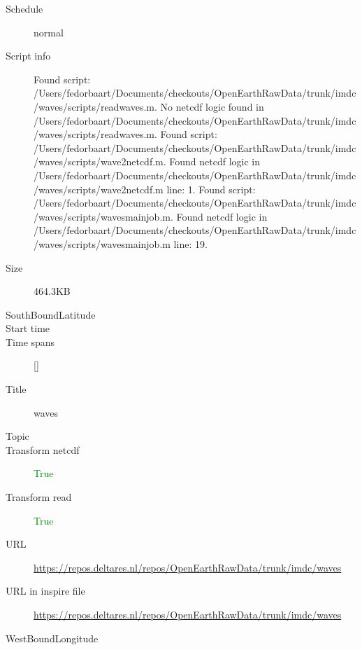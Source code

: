 \documentclass[9]{report}
\begin{document}
\begin{description}
\begin{verbatim}
\end{verbatim}
  \item[Schedule] normal
  \item[Script info] Found script: /Users/fedorbaart/Documents/checkouts/OpenEarthRawData/trunk/imdc/waves/scripts/readwaves.m.
No netcdf logic found in /Users/fedorbaart/Documents/checkouts/OpenEarthRawData/trunk/imdc/waves/scripts/readwaves.m.
Found script: /Users/fedorbaart/Documents/checkouts/OpenEarthRawData/trunk/imdc/waves/scripts/wave2netcdf.m.
Found netcdf logic in /Users/fedorbaart/Documents/checkouts/OpenEarthRawData/trunk/imdc/waves/scripts/wave2netcdf.m line: 1.
Found script: /Users/fedorbaart/Documents/checkouts/OpenEarthRawData/trunk/imdc/waves/scripts/wavesmainjob.m.
Found netcdf logic in /Users/fedorbaart/Documents/checkouts/OpenEarthRawData/trunk/imdc/waves/scripts/wavesmainjob.m line: 19.
  \item[Size] 464.3KB
  \item[SouthBoundLatitude] 
  \item[Start time] 
  \item[Time spans] []
  \item[Title]  waves 
  \item[Topic] 
  \item[Transform netcdf] \textcolor{green}{True}
  \item[Transform read] \textcolor{green}{True}
  \item[URL] \href{https://repos.deltares.nl/repos/OpenEarthRawData/trunk/imdc/waves}{https://repos.deltares.nl/repos/OpenEarthRawData/trunk/imdc/waves}
  \item[URL in inspire file] \href{https://repos.deltares.nl/repos/OpenEarthRawData/trunk/imdc/waves}{https://repos.deltares.nl/repos/OpenEarthRawData/trunk/imdc/waves}
  \item[WestBoundLongitude] 
\end{description}
\end{document}
